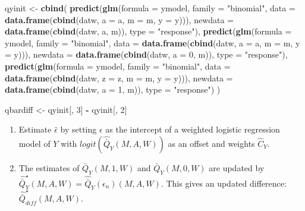 \documentclass[
  12pt, krantz2,
]{book}
\makeatletter
\newenvironment{Shaded}{\begin{snugshade}}{\end{snugshade}}
\newcommand{\DataTypeTok}[1]{\textcolor[rgb]{0.13,0.29,0.53}{#1}}
\newcommand{\DecValTok}[1]{\textcolor[rgb]{0.00,0.00,0.81}{#1}}
\newcommand{\KeywordTok}[1]{\textcolor[rgb]{0.13,0.29,0.53}{\textbf{#1}}}
\newcommand{\NormalTok}[1]{#1}
\newcommand{\OperatorTok}[1]{\textcolor[rgb]{0.81,0.36,0.00}{\textbf{#1}}}
\newcommand{\StringTok}[1]{\textcolor[rgb]{0.31,0.60,0.02}{#1}}
\newenvironment{kframe}{%
\medskip{}
\setlength{\fboxsep}{.8em}
 \def\at@end@of@kframe{}%
 \ifinner\ifhmode%
  \def\at@end@of@kframe{\end{minipage}}%
  \begin{minipage}{\columnwidth}%
 \fi\fi%
 \def\FrameCommand##1{\hskip\@totalleftmargin \hskip-\fboxsep
 \colorbox{shadecolor}{##1}\hskip-\fboxsep
     \hskip-\linewidth \hskip-\@totalleftmargin \hskip\columnwidth}%
 \MakeFramed {\advance\hsize-\width
   \@totalleftmargin\z@ \linewidth\hsize
   \@setminipage}}%
 {\par\unskip\endMakeFramed%
 \at@end@of@kframe}
\renewenvironment{Shaded}{\begin{kframe}}{\end{kframe}}
\theoremstyle{definition}
\theoremstyle{definition}
\theoremstyle{definition}
\newcommand{\1}{\mathbbm{1}}
\makeatother
\begin{document}
\begin{Shaded}
\begin{Highlighting}[]
\NormalTok{qyinit <-}\StringTok{ }\KeywordTok{cbind}\NormalTok{(}
  \KeywordTok{predict}\NormalTok{(}\KeywordTok{glm}\NormalTok{(}\DataTypeTok{formula =}\NormalTok{ ymodel, }\DataTypeTok{family =} \StringTok{"binomial"}\NormalTok{,}
              \DataTypeTok{data =} \KeywordTok{data.frame}\NormalTok{(}\KeywordTok{cbind}\NormalTok{(datw, }\DataTypeTok{a =}\NormalTok{ a, }\DataTypeTok{m =}\NormalTok{ m, }\DataTypeTok{y =}\NormalTok{ y))),}
          \DataTypeTok{newdata =} \KeywordTok{data.frame}\NormalTok{(}\KeywordTok{cbind}\NormalTok{(datw, a, m)), }\DataTypeTok{type =} \StringTok{"response"}\NormalTok{),}
  \KeywordTok{predict}\NormalTok{(}\KeywordTok{glm}\NormalTok{(}\DataTypeTok{formula =}\NormalTok{ ymodel, }\DataTypeTok{family =} \StringTok{"binomial"}\NormalTok{,}
              \DataTypeTok{data =} \KeywordTok{data.frame}\NormalTok{(}\KeywordTok{cbind}\NormalTok{(datw, }\DataTypeTok{a =}\NormalTok{ a, }\DataTypeTok{m =}\NormalTok{ m, }\DataTypeTok{y =}\NormalTok{ y))),}
          \DataTypeTok{newdata =} \KeywordTok{data.frame}\NormalTok{(}\KeywordTok{cbind}\NormalTok{(datw, }\DataTypeTok{a =} \DecValTok{0}\NormalTok{, m)), }\DataTypeTok{type =} \StringTok{"response"}\NormalTok{),}
  \KeywordTok{predict}\NormalTok{(}\KeywordTok{glm}\NormalTok{(}\DataTypeTok{formula =}\NormalTok{ ymodel, }\DataTypeTok{family =} \StringTok{"binomial"}\NormalTok{,}
              \DataTypeTok{data =} \KeywordTok{data.frame}\NormalTok{(}\KeywordTok{cbind}\NormalTok{(datw, }\DataTypeTok{z =}\NormalTok{ z, }\DataTypeTok{m =}\NormalTok{ m, }\DataTypeTok{y =}\NormalTok{ y))),}
          \DataTypeTok{newdata =} \KeywordTok{data.frame}\NormalTok{(}\KeywordTok{cbind}\NormalTok{(datw, }\DataTypeTok{a =} \DecValTok{1}\NormalTok{, m)), }\DataTypeTok{type =} \StringTok{"response"}\NormalTok{)}
\NormalTok{)}

\NormalTok{qbardiff <-}\StringTok{ }\NormalTok{qyinit[, }\DecValTok{3}\NormalTok{] }\OperatorTok{-}\StringTok{ }\NormalTok{qyinit[, }\DecValTok{2}\NormalTok{]}
\end{Highlighting}
\end{Shaded}

\begin{enumerate}
\def\labelenumi{\arabic{enumi}.}
\setcounter{enumi}{3}
\item
  Estimate \(\hat{\epsilon}\) by setting \(\epsilon\) as the intercept of a
  weighted logistic regression model of \(Y\) with
  \(logit(\hat{\bar{Q}}_{Y}(M,A,W))\) as an offset and weights \(\hat{C}_{Y}\).
\item
  The estimates of \(\bar{Q}_{Y}(M,1,W)\) and \(\bar{Q}_{Y}(M,0,W)\) are updated
  by \(\hat{\bar{Q}}^{\star}_{Y}(M,A,W) = \hat{\bar{Q}}_{Y}(\epsilon_n)(M,A,W)\). This gives an updated difference:
  \(\hat{\bar{Q}}^{\star}_{diff}(M,A,W)\).
\end{enumerate}
\end{document}
